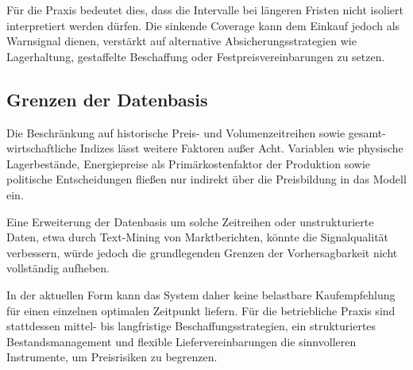 Für die Praxis bedeutet dies, dass die Intervalle bei längeren Fristen nicht isoliert interpretiert werden dürfen. Die sinkende Coverage kann dem Einkauf jedoch als Warnsignal dienen, verstärkt auf alternative Absicherungsstrategien wie Lagerhaltung, gestaffelte Beschaffung oder Festpreisvereinbarungen zu setzen.

\subsection{Grenzen der Datenbasis}
Die Beschränkung auf historische Preis- und Volumenzeitreihen sowie gesamt-wirtschaftliche Indizes lässt weitere Faktoren außer Acht.
Variablen wie physische Lagerbestände, Energiepreise als Primärkostenfaktor der Produktion sowie politische Entscheidungen fließen nur indirekt über die Preisbildung in das Modell ein.

Eine Erweiterung der Datenbasis um solche Zeitreihen oder unstrukturierte Daten, etwa durch Text-Mining von Marktberichten, könnte die Signalqualität verbessern, würde jedoch die grundlegenden Grenzen der Vorhersagbarkeit nicht vollständig aufheben.

In der aktuellen Form kann das System daher keine belastbare Kaufempfehlung für einen einzelnen optimalen Zeitpunkt liefern.
Für die betriebliche Praxis sind stattdessen mittel- bis langfristige Beschaffungsstrategien, ein strukturiertes Bestandsmanagement und flexible Liefervereinbarungen die sinnvolleren Instrumente, um Preisrisiken zu begrenzen.
